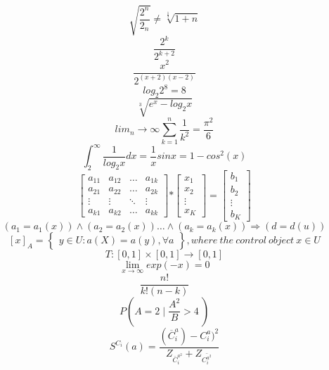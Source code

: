 \documentclass[10pt]{article}
\begin{document}
$$\sqrt{\frac{2^n}{2_n}}\neq \sqrt[\frac{1}{3}]{1+n}$$
$$\frac{2^k}{2^{k+2}}$$
$$\frac{x^2}{2^{(x+2)(x-2)}}$$
$$log_2{2^8}=8$$
$$\sqrt[3]{e^{x}-log_2{x}}$$
$$lim_n\to \infty\sum_{k=1}^{n}\frac{1}{k^{2}}=\frac{\pi^{2}}{6}$$
$$\int_{2}^{\infty}\frac{1}{log_{2}x}dx=\frac{1}{x}sinx=1-cos^{2}(x)$$
$$
\left[ \begin{array} {cccc}
a_{11}&a_{12} & \ldots & a_{1k} \\
a_{21} & a_{22} & \ldots & a_{2k} \\
\vdots & \vdots &\ddots&\vdots \\
a_{k1}& a_{k2}&\ldots&a_{kk}
\end{array}\right]
\mathbf{*}\left[ \begin{array} {c}
x_1\\
x_2\\
\vdots\\
x_K
\end{array}\right]
\mathbf{=}\left[ \begin{array} {c}
b_1\\
b_2\\
\vdots\\
b_K
\end{array}\right]
$$
$$ (a_{1}=a_1(x))\wedge(a_{2}=a_{2}(x))\ldots\wedge(a_{k}=a_{k}(x))	\Rightarrow(d=d(u))$$
$$[x]_{A}=\left\{ \begin{array} {cccc}
y \in U:a(X)=a(y),\forall{a}
\end{array}\right\}, where \ the \ control \ object\ x \in U$$
$$T: [0,1]\times[0,1]\to [0,1]$$
$$\lim_{x\to\infty} exp(-x)=0$$
$$\frac{n!}{k!(n-k)}$$
$$P \left(A=2 \mid\frac{A^2}{B}>4\ \right)$$
$$S^{C_i}(a)=\frac{(\overline{C}_i^a)-C_i^a)^2}{Z_{{\overline{C}_i^{a^2}}}+Z_{\bar{C_i^{a^2}}}}$$
\end{document}

